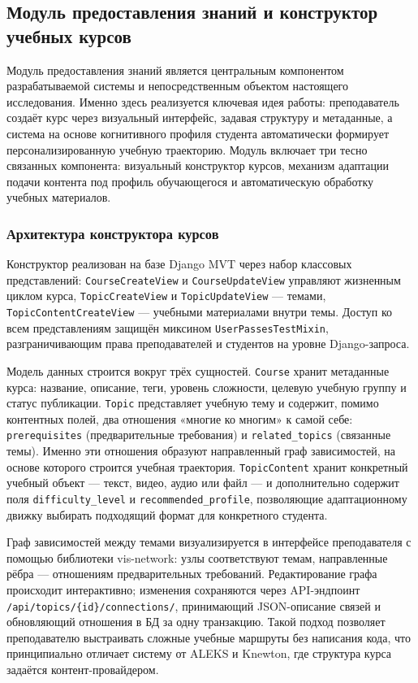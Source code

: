 \subsection{Модуль предоставления знаний и конструктор учебных курсов}
\label{sec:knowledge_module}

Модуль предоставления знаний является центральным компонентом
разрабатываемой системы и непосредственным объектом настоящего
исследования. Именно здесь реализуется ключевая идея работы:
преподаватель создаёт курс через визуальный интерфейс, задавая
структуру и метаданные, а система на основе когнитивного профиля
студента автоматически формирует персонализированную учебную
траекторию. Модуль включает три тесно связанных компонента:
визуальный конструктор курсов, механизм адаптации подачи контента
под профиль обучающегося и автоматическую обработку учебных материалов.

\subsubsection{Архитектура конструктора курсов}

Конструктор реализован на базе Django MVT через набор классовых
представлений: \texttt{CourseCreateView} и \texttt{CourseUpdateView}
управляют жизненным циклом курса, \texttt{TopicCreateView} и
\texttt{TopicUpdateView} — темами, \texttt{TopicContentCreateView} —
учебными материалами внутри темы. Доступ ко всем представлениям
защищён миксином \texttt{UserPassesTestMixin}, разграничивающим
права преподавателей и студентов на уровне Django-запроса.

Модель данных строится вокруг трёх сущностей. \texttt{Course}
хранит метаданные курса: название, описание, теги, уровень
сложности, целевую учебную группу и статус публикации.
\texttt{Topic} представляет учебную тему и содержит, помимо
контентных полей, два отношения «многие ко многим» к самой себе:
\texttt{prerequisites} (предварительные требования) и
\texttt{related\_topics} (связанные темы). Именно эти отношения
образуют направленный граф зависимостей, на основе которого
строится учебная траектория. \texttt{TopicContent} хранит
конкретный учебный объект — текст, видео, аудио или файл —
и дополнительно содержит поля \texttt{difficulty\_level} и
\texttt{recommended\_profile}, позволяющие адаптационному
движку выбирать подходящий формат для конкретного студента.

Граф зависимостей между темами визуализируется в интерфейсе
преподавателя с помощью библиотеки vis-network: узлы
соответствуют темам, направленные рёбра — отношениям
предварительных требований. Редактирование графа происходит
интерактивно; изменения сохраняются через API-эндпоинт
\texttt{/api/topics/\{id\}/connections/}, принимающий
JSON-описание связей и обновляющий отношения в БД за одну
транзакцию. Такой подход позволяет преподавателю выстраивать
сложные учебные маршруты без написания кода, что принципиально
отличает систему от ALEKS и Knewton, где структура курса
задаётся контент-провайдером.

